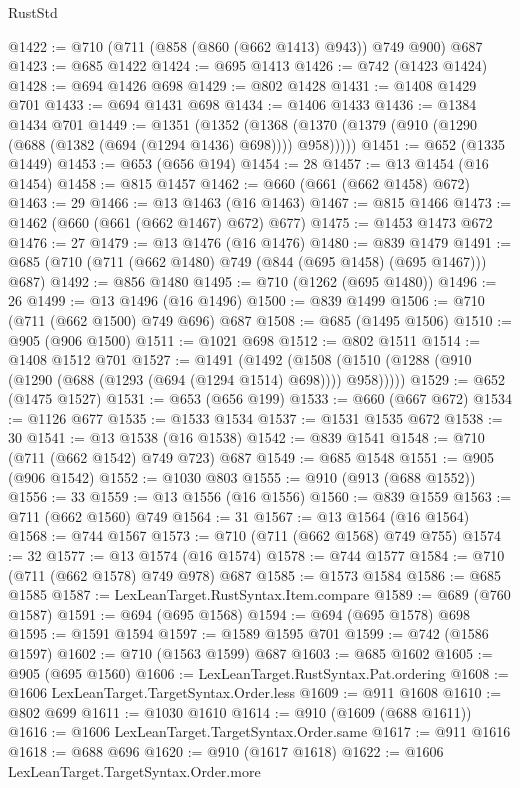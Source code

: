 \begin{lexlean}{RustStd}
\begin{coremodule}
@1422 := @710 (@711 (@858 (@860 (@662 @1413) @943)) @749 @900) @687
@1423 := @685 @1422
@1424 := @695 @1413
@1426 := @742 (@1423 @1424)
@1428 := @694 @1426 @698
@1429 := @802 @1428
@1431 := @1408 @1429 @701
@1433 := @694 @1431 @698
@1434 := @1406 @1433
@1436 := @1384 @1434 @701
@1449 := @1351
    (@1352 (@1368 (@1370 (@1379 (@910 (@1290 (@688 (@1382 (@694 (@1294 @1436) @698)))) @958)))))
@1451 := @652 (@1335 @1449)
@1453 := @653 (@656 @194)
@1454 := 28
@1457 := @13 @1454 (@16 @1454)
@1458 := @815 @1457
@1462 := @660 (@661 (@662 @1458) @672)
@1463 := 29
@1466 := @13 @1463 (@16 @1463)
@1467 := @815 @1466
@1473 := @1462 (@660 (@661 (@662 @1467) @672) @677)
@1475 := @1453 @1473 @672
@1476 := 27
@1479 := @13 @1476 (@16 @1476)
@1480 := @839 @1479
@1491 := @685 (@710 (@711 (@662 @1480) @749 (@844 (@695 @1458) (@695 @1467))) @687)
@1492 := @856 @1480
@1495 := @710 (@1262 (@695 @1480))
@1496 := 26
@1499 := @13 @1496 (@16 @1496)
@1500 := @839 @1499
@1506 := @710 (@711 (@662 @1500) @749 @696) @687
@1508 := @685 (@1495 @1506)
@1510 := @905 (@906 @1500)
@1511 := @1021 @698
@1512 := @802 @1511
@1514 := @1408 @1512 @701
@1527 := @1491
    (@1492 (@1508 (@1510 (@1288 (@910 (@1290 (@688 (@1293 (@694 (@1294 @1514) @698)))) @958)))))
@1529 := @652 (@1475 @1527)
@1531 := @653 (@656 @199)
@1533 := @660 (@667 @672)
@1534 := @1126 @677
@1535 := @1533 @1534
@1537 := @1531 @1535 @672
@1538 := 30
@1541 := @13 @1538 (@16 @1538)
@1542 := @839 @1541
@1548 := @710 (@711 (@662 @1542) @749 @723) @687
@1549 := @685 @1548
@1551 := @905 (@906 @1542)
@1552 := @1030 @803
@1555 := @910 (@913 (@688 @1552))
@1556 := 33
@1559 := @13 @1556 (@16 @1556)
@1560 := @839 @1559
@1563 := @711 (@662 @1560) @749
@1564 := 31
@1567 := @13 @1564 (@16 @1564)
@1568 := @744 @1567
@1573 := @710 (@711 (@662 @1568) @749 @755)
@1574 := 32
@1577 := @13 @1574 (@16 @1574)
@1578 := @744 @1577
@1584 := @710 (@711 (@662 @1578) @749 @978) @687
@1585 := @1573 @1584
@1586 := @685 @1585
@1587 := LexLeanTarget.RustSyntax.Item.compare
@1589 := @689 (@760 @1587)
@1591 := @694 (@695 @1568)
@1594 := @694 (@695 @1578) @698
@1595 := @1591 @1594
@1597 := @1589 @1595 @701
@1599 := @742 (@1586 @1597)
@1602 := @710 (@1563 @1599) @687
@1603 := @685 @1602
@1605 := @905 (@695 @1560)
@1606 := LexLeanTarget.RustSyntax.Pat.ordering
@1608 := @1606 LexLeanTarget.TargetSyntax.Order.less
@1609 := @911 @1608
@1610 := @802 @699
@1611 := @1030 @1610
@1614 := @910 (@1609 (@688 @1611))
@1616 := @1606 LexLeanTarget.TargetSyntax.Order.same
@1617 := @911 @1616
@1618 := @688 @696
@1620 := @910 (@1617 @1618)
@1622 := @1606 LexLeanTarget.TargetSyntax.Order.more

\end{coremodule}
\end{lexlean}
